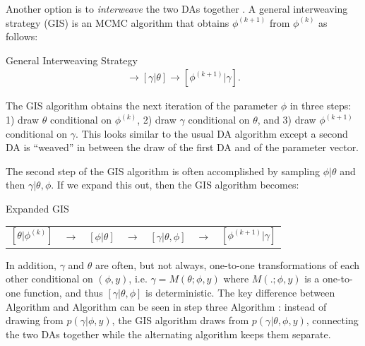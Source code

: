 \documentclass[12pt]{article}
\begin{document}
Another option is to {\it interweave} the two DAs together \citep{yu2011center}. A general interweaving strategy (GIS) is an MCMC algorithm that obtains $\phi^{(k+1)}$ from $\phi^{(k)}$ as follows:
\begin{alg*}[GIS]General Interweaving Strategy\label{alg:GIS}
  \begin{align*}
    [\theta|\phi^{(k)}] \to [\gamma|\theta] \to [\phi^{(k+1)}|\gamma].
  \end{align*}
\end{alg*}
\noindent The GIS algorithm obtains the next iteration of the parameter $\phi$ in three steps: 1) draw $\theta$ conditional on $\phi^{(k)}$, 2) draw $\gamma$ conditional on $\theta$, and 3) draw $\phi^{(k+1)}$ conditional on $\gamma$. This looks similar to the usual DA algorithm except a second DA is ``weaved'' in between the draw of the first DA and of the parameter vector. 

The second step of the GIS algorithm is often accomplished by sampling $\phi|\theta$ and then $\gamma|\theta,\phi$. If we expand this out, then the GIS algorithm becomes:
\begin{alg*}[eGIS]Expanded GIS\label{alg:GIS2}
  \begin{center}
    \begin{tabular}{lllllll}
      $[\theta|\phi^{(k)}]$& $\to$& $[\phi|\theta]$& $\to $&$[\gamma|\theta,\phi]$& $\to$& $[\phi^{(k+1)}|\gamma]$
    \end{tabular}
  \end{center}
\end{alg*}
\noindent
In addition, $\gamma$ and $\theta$ are often, but not always, one-to-one transformations of each other conditional on $(\phi,y)$, i.e. $\gamma = M(\theta;\phi,y)$ where $M(.;\phi,y)$ is a one-to-one function, and thus $[\gamma|\theta,\phi]$ is deterministic.
The key difference between Algorithm  and Algorithm  can be seen in step three Algorithm : instead of drawing from $p(\gamma|\phi,y)$, the GIS algorithm draws from $p(\gamma|\theta,\phi,y)$, connecting the two DAs together while the alternating algorithm keeps them separate.
\end{document}
